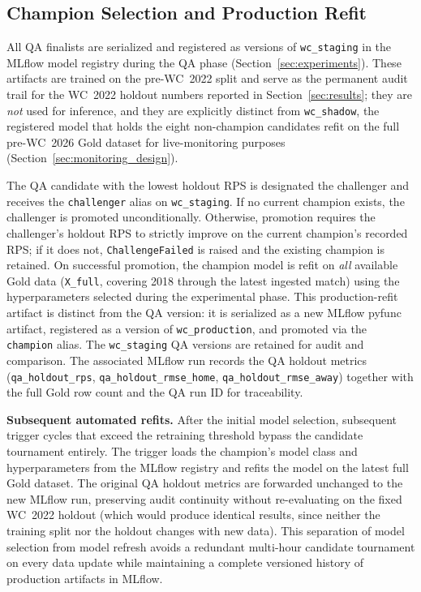\documentclass[conference]{IEEEtran}
\begin{document}
\subsection{Champion Selection and Production Refit}
All QA finalists are serialized and registered as versions of
\texttt{wc\_staging} in the MLflow model registry during the QA phase
(Section~\ref{sec:experiments}).  These artifacts are trained on the
pre-WC~2022 split and serve as the permanent audit trail for the
WC~2022 holdout numbers reported in Section~\ref{sec:results}; they are
\emph{not} used for inference, and they are explicitly distinct from
\texttt{wc\_shadow}, the registered model that holds the eight
non-champion candidates refit on the full pre-WC~2026 Gold dataset for
live-monitoring purposes (Section~\ref{sec:monitoring_design}).

The QA candidate with the lowest holdout RPS is designated the challenger
and receives the \texttt{challenger} alias on \texttt{wc\_staging}.
If no current champion exists, the challenger is promoted unconditionally.
Otherwise, promotion requires the challenger's holdout RPS to strictly
improve on the current champion's recorded RPS; if it does not,
\texttt{ChallengeFailed} is raised and the existing champion is retained.
On successful promotion, the champion model is refit on \emph{all} available
Gold data (\texttt{X\_full}, covering 2018 through the latest ingested match)
using the hyperparameters selected during the experimental phase.
This production-refit artifact is distinct from the QA version:
it is serialized as a new MLflow pyfunc artifact, registered as a version of
\texttt{wc\_production}, and promoted via the \texttt{champion} alias.
The \texttt{wc\_staging} QA versions are retained for audit and comparison.
The associated MLflow run records the QA holdout metrics
(\texttt{qa\_holdout\_rps}, \texttt{qa\_holdout\_rmse\_home},
\texttt{qa\_holdout\_rmse\_away}) together with the full Gold row count and
the QA run ID for traceability.

\textbf{Subsequent automated refits.}
After the initial model selection, subsequent trigger cycles that exceed the
retraining threshold bypass the candidate tournament entirely.  The trigger
loads the champion's model class and hyperparameters from the MLflow
registry and refits the model on the latest full Gold dataset.  The original
QA holdout metrics are forwarded unchanged to the new MLflow run, preserving
audit continuity without re-evaluating on the fixed WC~2022 holdout (which
would produce identical results, since neither the training split nor the
holdout changes with new data).  This separation of model selection from
model refresh avoids a redundant multi-hour candidate tournament on
every data update while maintaining a complete versioned history of
production artifacts in MLflow.
\end{document}
